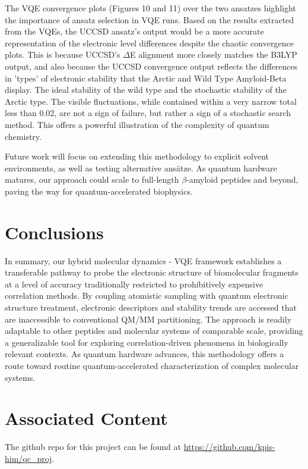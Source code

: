 \documentclass[%
 reprint,
 amsmath,amssymb,
 aps,
]{revtex4-2}
\begin{document}
The VQE convergence plots (Figures 10 and 11) over the two ansatzes highlight the importance of ansatz selection in VQE runs. Based on the results extracted from the VQEs, the UCCSD ansatz's output would be a more accurate representation of the electronic level differences despite the chaotic convergence plots. This is because UCCSD's $\Delta$E alignment more closely matches the B3LYP output, and also because the UCCSD convergence output reflects the differences in 'types' of electronic stability that the Arctic and Wild Type Amyloid-Beta display. The ideal stability of the wild type and the stochastic stability of the Arctic type. The visible fluctuations, while contained within a very narrow total less than 0.02, are not a sign of failure, but rather a sign of a stochastic search method. This offers a powerful illustration of the complexity of quantum chemistry.

Future work will focus on extending this methodology to explicit solvent environments, as well as testing alternative ansätze. As quantum hardware matures, our approach could scale to full-length $\beta$-amyloid peptides and beyond, paving the way for quantum-accelerated biophysics.

\section{Conclusions}\label{sec4}

In summary, our hybrid molecular dynamics - VQE framework establishes a transferable pathway to probe the electronic structure of biomolecular fragments at a level of accuracy traditionally restricted to prohibitively expensive correlation methods. By coupling atomistic sampling with quantum electronic structure treatment, electronic descriptors and stability trends are accessed that are inaccessible to conventional QM/MM partitioning. The approach is readily adaptable to other peptides and molecular systems of comparable scale, providing a generalizable tool for exploring correlation-driven phenomena in biologically relevant contexts. As quantum hardware advances, this methodology offers a route toward routine quantum-accelerated characterization of complex molecular systems.
        
\section{Associated Content}

The github repo for this project can be found at
\url{https://github.com/kpis-him/qc_proj}.



                        
\end{document}
